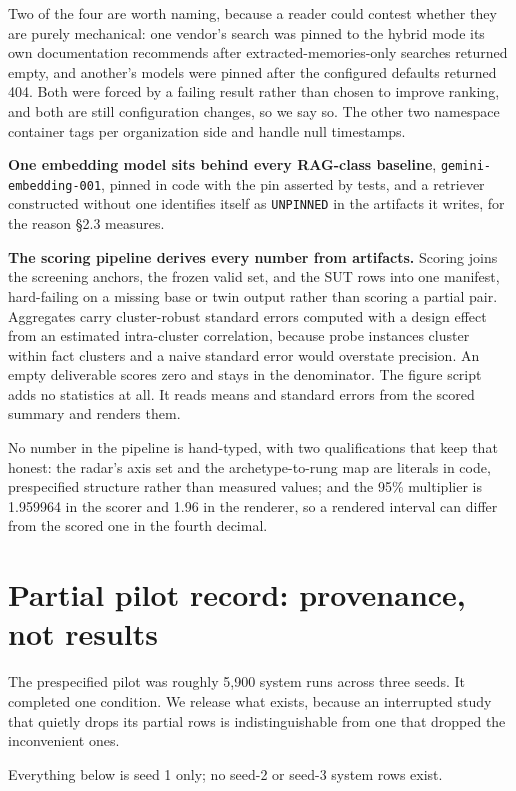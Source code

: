 \documentclass[11pt]{article}
\newcommand{\code}[1]{\texttt{\small #1}}
\begin{document}
Two of the four are worth naming, because a reader could contest whether they
are purely mechanical: one vendor's search was pinned to the hybrid mode its own
documentation recommends after extracted-memories-only searches returned empty,
and another's models were pinned after the configured defaults returned 404.
Both were forced by a failing result rather than chosen to improve ranking, and
both are still configuration changes, so we say so. The other two namespace
container tags per organization side and handle null timestamps.

\textbf{One embedding model sits behind every RAG-class baseline},
\code{gemini-embedding-001}, pinned in code with the pin asserted by tests, and a
retriever constructed without one identifies itself as \code{UNPINNED} in the
artifacts it writes, for the reason \S2.3 measures.

\textbf{The scoring pipeline derives every number from artifacts.} Scoring joins
the screening anchors, the frozen valid set, and the SUT rows into one manifest,
hard-failing on a missing base or twin output rather than scoring a partial
pair.
Aggregates carry cluster-robust standard errors computed with a design effect
from an estimated intra-cluster correlation, because probe instances cluster
within fact clusters and a naive standard error would overstate precision. An
empty deliverable scores zero and stays in the denominator. The figure script adds
no statistics at all. It reads means and standard errors from the scored summary
and renders them.

No number in the pipeline is hand-typed, with two qualifications that keep
that honest: the radar's axis set and the archetype-to-rung map are literals in
code, prespecified structure rather than measured values; and the 95\%
multiplier is 1.959964 in the scorer and 1.96 in the renderer, so a rendered
interval can differ from the scored one in the fourth decimal.

\section{Partial pilot record: provenance, not results}

The prespecified pilot was roughly 5{,}900 system runs across three seeds. It
completed one condition. We release what exists, because an interrupted study that
quietly drops its partial rows is indistinguishable from one that dropped the
inconvenient ones.

Everything below is seed 1 only; no seed-2 or seed-3 system rows exist.
\end{document}
